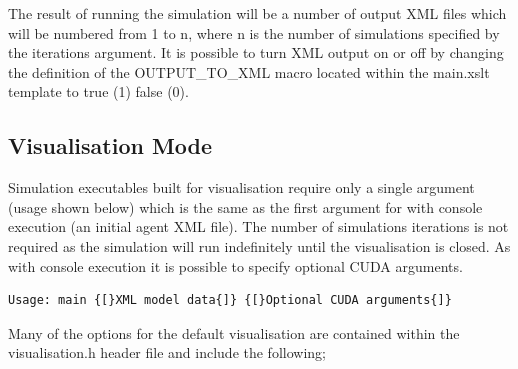 \documentclass[11pt, a4paper, onecolumn, oneside]{report}
\begin{document}
The result of running the simulation will be a number of output XML files which will be numbered from 1 to n, where n is the number of simulations specified by the iterations argument.
It is possible to turn XML output on or off by changing the definition of the OUTPUT\_TO\_XML macro located within the main.xslt template to true (1) false (0).

\subsection{Visualisation Mode}
\label{sec:452}

Simulation executables built for visualisation require only a single argument (usage shown below) which is the same as the first argument for with console execution (an initial agent XML file).
The number of simulations iterations is not required as the simulation will run indefinitely until the visualisation is closed.
As with console execution it is possible to specify optional CUDA arguments.

\begin{verbatim}
Usage: main {[}XML model data{]} {[}Optional CUDA arguments{]}
\end{verbatim}

Many of the options for the default visualisation are contained within the visualisation.h header file and include the following;
\end{document}
